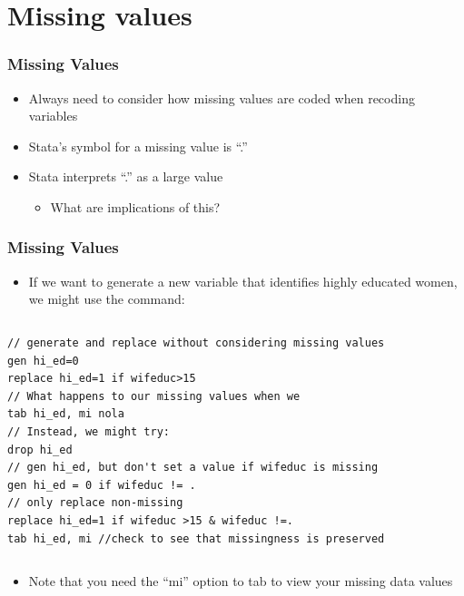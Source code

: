 \documentclass[table]{beamer}
\begin{document}
\section{Missing values}
\label{sec-4}
\begin{frame}
\frametitle{Missing Values}
\label{sec-4-1}

\begin{itemize}
\item Always need to consider how missing values
  are coded when recoding variables
\item Stata's symbol for a missing value is ``.''
\item Stata interprets ``.'' as a large value
\begin{itemize}
\item What are implications of this?
\end{itemize}
\end{itemize}
\end{frame}
\begin{frame}[fragile]
\frametitle{Missing Values}
\label{sec-4-2}

\begin{itemize}
\item If we want to generate a new variable that identifies highly educated women, we might use the command:
\end{itemize}
\vspace{-.5em} \begin{columns}  \begin{block}{}

\begin{verbatim}
// generate and replace without considering missing values
gen hi_ed=0
replace hi_ed=1 if wifeduc>15
// What happens to our missing values when we
tab hi_ed, mi nola
// Instead, we might try:
drop hi_ed
// gen hi_ed, but don't set a value if wifeduc is missing
gen hi_ed = 0 if wifeduc != . 
// only replace non-missing
replace hi_ed=1 if wifeduc >15 & wifeduc !=. 
tab hi_ed, mi //check to see that missingness is preserved
\end{verbatim}
\end{block} \end{columns}

\begin{itemize}
\item Note that you need the ``mi'' option to tab to view your
  missing data values
\end{itemize}
\end{frame}
\end{document}
